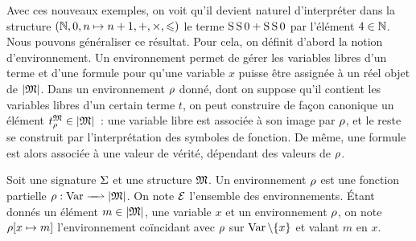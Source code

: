Avec ces nouveaux exemples, on voit qu'il devient naturel d'interpréter dans la
structure $(\mathbb N,0,n\mapsto n+1,+,\times,\leqslant)$ le terme
$\operatorname{S}\operatorname{S} 0 + \operatorname{S}\operatorname{S} 0$ par l'élément $4\in\mathbb N$. Nous pouvons généraliser ce
résultat. Pour cela, on définit d'abord la notion d'environnement. Un
environnement permet de gérer les variables libres d'un terme et d'une formule
pour qu'une variable $x$ puisse être assignée à un réel objet de $\left\vert \mathfrak{M}\right\vert$. Dans
un environnement $\rho$ donné, dont on suppose qu'il contient les variables
libres d'un certain terme $t$, on peut construire de façon canonique un élément
$t^{\mathfrak{M}}_{\rho} \in \left\vert \mathfrak{M}\right\vert$~: une variable libre est associée à son
image par $\rho$, et le reste se construit par l'interprétation des symboles
de fonction. De même, une formule est alors associée à une valeur de vérité,
dépendant des valeurs de $\rho$.

\begin{definition}[Environnement]
  Soit une signature $\Sigma$ et une structure $\mathfrak{M}$. Un environnement
  $\rho$ est une fonction partielle
  $\makeFunNamePartial{\env}{\Var}{\carMM}$. On
  note $\mathcal E$ l'ensemble des environnements. \'Etant donnés un élément
  $m\in\left\vert \mathfrak{M}\right\vert$, une variable $x$ et un environnement $\rho$, on note
  $\rho[x \mapsto m]$ l'environnement coïncidant avec $\rho$ sur
  $\operatorname{Var}\setminus\{x\}$ et valant $m$ en $x$.
\end{definition}

